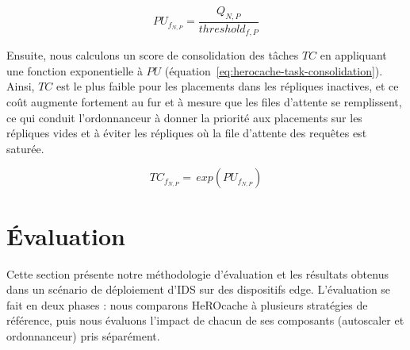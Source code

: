 \begin{equation}
    PU_{f_{N, P}} = \frac{Q_{N, P}}{threshold_{f, P}}
\label{eq:herocache-platform-usage}
\end{equation}

Ensuite, nous calculons un score de consolidation des tâches $TC$ en appliquant une fonction exponentielle à $PU$ (équation~\ref{eq:herocache-task-consolidation}). Ainsi, $TC$ est le plus faible pour les placements dans les répliques inactives, et ce coût augmente fortement au fur et à mesure que les files d'attente se remplissent, ce qui conduit l'ordonnanceur à donner la priorité aux placements sur les répliques vides et à éviter les répliques où la file d'attente des requêtes est saturée.

\begin{equation}
    TC_{{f}_{N, P}} = \, exp(PU_{f_{N, P}})
\label{eq:herocache-task-consolidation}
\end{equation}

\section{Évaluation}
\label{section:herocache-evaluation}

Cette section présente notre méthodologie d'évaluation et les résultats obtenus dans un scénario de déploiement d'IDS sur des dispositifs edge. L'évaluation se fait en deux phases : nous comparons HeROcache à plusieurs stratégies de référence, puis nous évaluons l'impact de chacun de ses composants (autoscaler et ordonnanceur) pris séparément.

